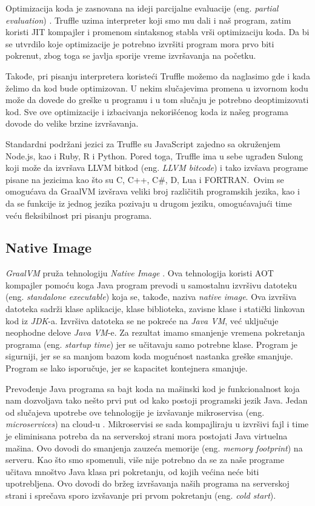 \documentclass[a4paper]{article}
\begin{document}
Optimizacija koda je zasnovana na ideji parcijalne evaluacije (eng. \emph{partial evaluation}) \cite{whataboutgraalvm}. Truffle uzima interpreter koji smo mu dali i naš program, zatim koristi JIT kompajler i promenom sintaksnog stabla vrši optimizaciju koda. Da bi se utvrdilo koje optimizacije je potrebno izvršiti program mora prvo biti pokrenut, zbog toga se javlja sporije vreme izvršavanja na početku.

Takođe, pri pisanju interpretera koristeći Truffle možemo da naglasimo gde i kada želimo da kod bude optimizovan. U nekim slučajevima promena u izvornom kodu može da dovede do greške u programu i u tom slučaju je potrebno deoptimizovati kod. Sve ove optimizacije i izbacivanja nekorišćenog koda iz našeg programa dovode do velike brzine izvršavanja.

Standardni podržani jezici za Truffle su JavaScript zajedno sa okruženjem Node.js, kao i Ruby, R i Python. Pored toga, Truffle ima u sebe ugrađen Sulong koji može da izvršava LLVM bitkod (eng. \emph{LLVM bitcode}) i tako izvšava programe pisane na jezicima kao što su C, C++, C\#, D, Lua i FORTRAN.\ Ovim se omogućava da GraalVM izvšrava veliki broj različitih programskih jezika, kao i da se funkcije iz jednog jezika pozivaju u drugom jeziku, omogućavajući time veću fleksibilnost pri pisanju programa.

\subsection{Native Image}
\label{sub:native}

\emph{GraalVM} pruža tehnologiju \emph{Native Image} \cite{graalvm}. Ova tehnologija koristi AOT kompajler pomoću koga Java program prevodi u samostalnu izvršivu datoteku (eng. \emph{standalone executable}) koja se, takođe, naziva \emph{native image}. Ova izvršiva datoteka sadrži klase aplikacije, klase biblioteka, zavisne klase i statički linkovan kod iz \emph{JDK}-a. Izvršiva datoteka se ne pokreće na \emph{Java VM}, već uključuje neophodne delove \emph{Java VM}-e. Za rezultat imamo smanjenje vremena pokretanja programa (eng. \emph{startup time}) jer se učitavaju samo potrebne klase. Program je sigurniji, jer se sa manjom bazom koda mogućnost nastanka greške smanjuje. Program se lako isporučuje, jer se kapacitet kontejnera smanjuje.

Prevođenje Java programa sa bajt koda na mašinski kod je funkcionalnost koja nam dozvoljava tako nešto prvi put od kako postoji programski jezik Java. Jedan od slučajeva upotrebe ove tehnologije je izvšavanje mikroservisa (eng. \emph{microservices}) na cloud-u \cite{sipek21}. Mikroservisi se sada kompajliraju u izvršivi fajl i time je eliminisana potreba da na serverskoj strani mora postojati Java virtuelna mašina. Ovo dovodi do smanjenja zauzeća memorije (eng. \emph{memory footprint}) na serveru. Kao što smo spomenuli, više nije potrebno da se za naše programe učitava mnoštvo Java klasa pri pokretanju, od kojih većina neće biti upotrebljena. Ovo dovodi do bržeg izvršavanja naših programa na serverskoj strani i sprečava sporo izvšavanje pri prvom pokretanju (eng. \emph{cold start}). 
\end{document}
